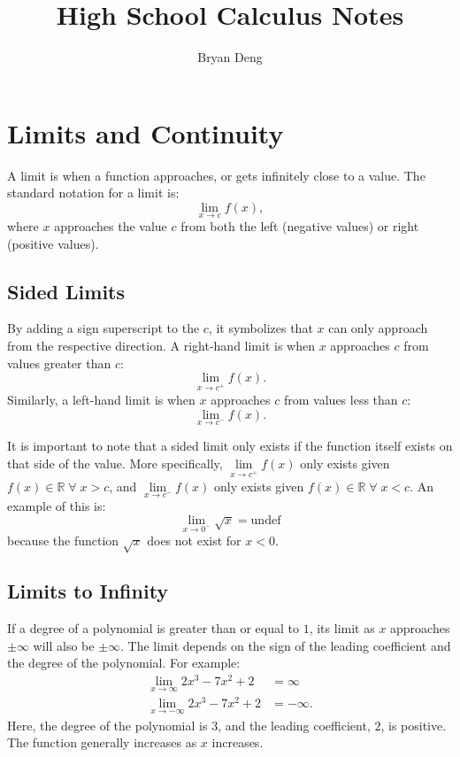 \documentclass[12pt]{article}
\title{High School Calculus Notes}
\author{Bryan Deng}
\newcommand{\spacedforall}{\;\forall\;}
\newcommand{\R}{\mathbb{R}} %
\begin{document}
\maketitle
\newpage
\tableofcontents
\newpage

\section{Limits and Continuity}
A limit is when a function approaches, or gets infinitely close to a value. The standard notation for a limit is:
\[ \lim_{x \to c} f(x), \]
where $x$ approaches the value $c$ from both the left (negative values) or right (positive values).

\subsection{Sided Limits}
By adding a sign superscript to the $c$, it symbolizes that $x$ can only approach from the respective direction. A right-hand limit is when $x$ approaches $c$ from values greater than $c$:
\[ \lim_{x \to c^+} f(x). \]
Similarly, a left-hand limit is when $x$ approaches $c$ from values less than $c$:
\[ \lim_{x \to c^-} f(x). \]

It is important to note that a sided limit only exists if the function itself exists on that side of the value. More specifically,
$\lim \limits_{x \to c^+} f(x)$ only exists given $f(x) \in \R \spacedforall x > c$, and $\lim \limits_{x \to c^-} f(x)$ only exists given $f(x) \in \R \spacedforall x < c$. An example of this is:
\[ \lim_{x \to 0^-} \sqrt{x} = \text{undef} \]
because the function $\sqrt{x}$ does not exist for $x < 0$.

\subsection{Limits to Infinity}
If a degree of a polynomial is greater than or equal to $1$, its limit as $x$ approaches $\pm \infty$ will also be $\pm \infty$. The limit depends on the sign of the leading coefficient and the degree of the polynomial. For example:
\begin{align*}
	\lim_{x \to \infty} 2 x^3 - 7x^2 + 2 &= \infty   \\
	\lim_{x \to -\infty} 2 x^3 - 7x^2 + 2 &= -\infty.
\end{align*}
Here, the degree of the polynomial is $3$, and the leading coefficient, $2$, is positive. The function generally increases as $x$ increases.
\end{document}
